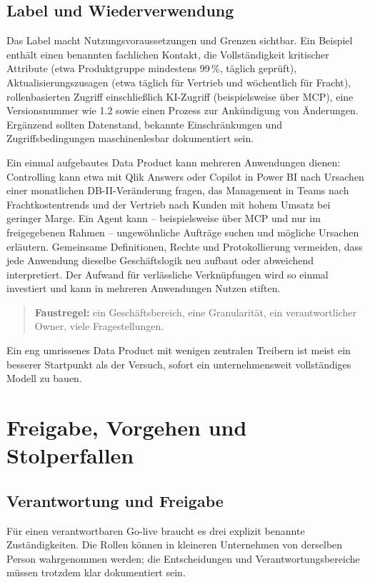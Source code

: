 \documentclass[a4paper,12pt]{article}
\theoremstyle{definition}
\begin{document}
\subsection{Label und Wiederverwendung}
Das Label macht Nutzungsvoraussetzungen und Grenzen sichtbar. Ein Beispiel enthält einen benannten fachlichen Kontakt, die Vollständigkeit kritischer Attribute (etwa Produktgruppe mindestens 99\,\%, täglich geprüft), Aktualisierungszusagen (etwa täglich für Vertrieb und wöchentlich für Fracht), rollenbasierten Zugriff einschließlich KI-Zugriff (beispielsweise über MCP), eine Versionsnummer wie 1.2 sowie einen Prozess zur Ankündigung von Änderungen. Ergänzend sollten Datenstand, bekannte Einschränkungen und Zugriffsbedingungen maschinenlesbar dokumentiert sein.

Ein einmal aufgebautes Data Product kann mehreren Anwendungen dienen: Controlling kann etwa mit Qlik Answers oder Copilot in Power BI nach Ursachen einer monatlichen DB-II-Veränderung fragen, das Management in Teams nach Frachtkostentrends und der Vertrieb nach Kunden mit hohem Umsatz bei geringer Marge. Ein Agent kann – beispielsweise über MCP und nur im freigegebenen Rahmen – ungewöhnliche Aufträge suchen und mögliche Ursachen erläutern. Gemeinsame Definitionen, Rechte und Protokollierung vermeiden, dass jede Anwendung dieselbe Geschäftslogik neu aufbaut oder abweichend interpretiert. Der Aufwand für verlässliche Verknüpfungen wird so einmal investiert und kann in mehreren Anwendungen Nutzen stiften.

\begin{quote}
\textbf{Faustregel:} ein Geschäftsbereich, eine Granularität, ein verantwortlicher Owner, viele Fragestellungen.
\end{quote}
Ein eng umrissenes Data Product mit wenigen zentralen Treibern ist meist ein besserer Startpunkt als der Versuch, sofort ein unternehmensweit vollständiges Modell zu bauen.

\section{Freigabe, Vorgehen und Stolperfallen}
\label{sec:release}

\subsection{Verantwortung und Freigabe}

Für einen verantwortbaren Go-live braucht es drei explizit benannte Zuständigkeiten. Die Rollen können in kleineren Unternehmen von derselben Person wahrgenommen werden; die Entscheidungen und Verantwortungsbereiche müssen trotzdem klar dokumentiert sein.
\end{document}
